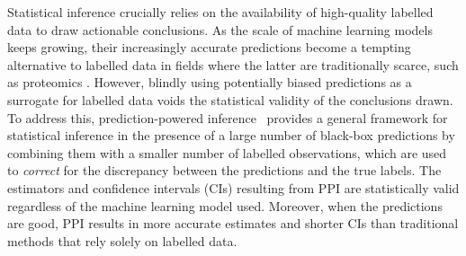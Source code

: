 Statistical inference crucially relies on the availability of high-quality labelled data to draw actionable conclusions. As the scale of machine learning models keeps growing, their increasingly accurate predictions become a tempting alternative to labelled data in fields where the latter are traditionally scarce, such as proteomics \citep{Jumper2021}. However, blindly using potentially biased predictions as a surrogate for labelled data voids the statistical validity of the conclusions drawn. To address this, prediction-powered inference~\citep{Angelopoulos2023} provides a general framework for statistical inference in the presence of a large number of black-box predictions by combining them with a smaller number of labelled observations, which are used to \textit{correct} for the discrepancy between the predictions and the true labels. The estimators and confidence intervals (CIs) resulting from PPI are statistically valid regardless of the machine learning model used. Moreover, when the predictions are good, PPI results in more accurate estimates and shorter CIs than traditional methods that rely solely on labelled data. 

